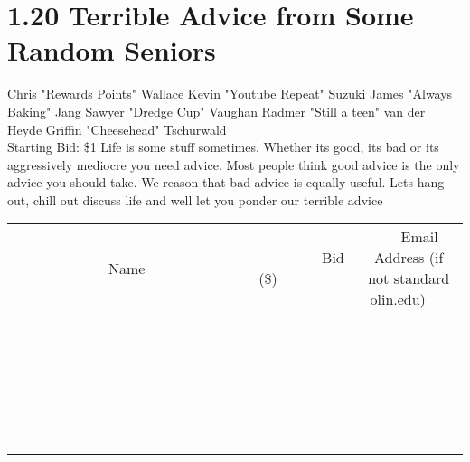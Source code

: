 \documentclass[11pt]{article}
\begin{document}
\section*{1.20 Terrible Advice from Some Random Seniors}
Chris "Rewards Points" Wallace Kevin "Youtube Repeat" Suzuki James "Always Baking" Jang Sawyer "Dredge Cup" Vaughan Radmer "Still a teen" van der Heyde Griffin "Cheesehead" Tschurwald
\\
Starting Bid: \$1
\newline
Life is some stuff sometimes. Whether its good, its bad or its aggressively mediocre you need advice. Most people think good advice is the only advice you should take. We reason that bad advice is equally useful. Lets hang out, chill out discuss life and well let you ponder our terrible advice
\\[6ex]
\begin{tabular}{c c c}
~~~~~~~~~~~~~Name~~~~~~~~~~~~~ & ~~~~~~~~~Bid (\$)~~~~~~~~~  & ~~~Email Address (if not standard olin.edu)~~~\\
 & & \\
\hline
 & & \\
\hline
 & & \\
\hline
 & & \\
\hline
 & & \\
\hline
 & & \\
\hline
 & & \\
\hline
 & & \\
\hline
 & & \\
\hline
 & & \\
\hline
 & & \\
\hline
 & & \\
\hline
 & & \\
\hline
 & & \\
\hline
 & & \\
\hline
 & & \\
\hline
 & & \\
\hline
 & & \\
\hline
 & & \\
\hline
 & & \\
\hline
 & & \\
\hline
 & & \\
\hline
 & & \\
\hline
 & & \\
\hline
 & & \\
\hline
 & & \\
\hline
\end{tabular}
\newpage
\end{document}
